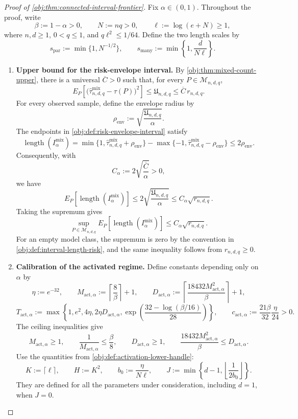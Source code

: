 \begin{proof}[Proof of \cref{obj:thm:connected-interval-frontier}]
Fix \(\alpha\in(0,1)\). Throughout the proof, write
\[
\beta:=1-\alpha>0,\qquad
N:=nq>0,\qquad
\ell:=\log(e+N)\ge1,
\]
where \(n,d\ge1\), \(0<q\le1\), and \(q\ell^2\le1/64\).
Define the two length scales by
\[
s_{\mathrm{par}}:=\min\{1,N^{-1/2}\},
\qquad
s_{\mathrm{many}}:=\min\left\{1,\frac{d}{N\ell}\right\}.
\]

\begin{enumerate}
\item \label{proof:connected-interval-upper}\textbf{Upper bound for the risk-envelope interval.}
By \cref{obj:thm:mixed-count-upper}, there is a universal
\(\overline C>0\) such that, for every \(P\in\mathcal M_{n,d,q}\),
\[
E_P\!\left[
  \bigl(\widehat\tau^{\mathrm{mix}}_{n,d,q}-\tau(P)\bigr)^2
\right]
\le \mathfrak U_{n,d,q}
\le \overline C\,r_{n,d,q}.
\]
For every observed sample, define the envelope radius by
\[
\rho_{\mathrm{env}}
:=\sqrt{\frac{\mathfrak U_{n,d,q}}{\alpha}}.
\]
The endpoints in \cref{obj:def:risk-envelope-interval} satisfy
\[
\operatorname{length}(I^{\mathrm{mix}}_\alpha)
=
\min\{1,\widehat\tau^{\mathrm{mix}}_{n,d,q}+\rho_{\mathrm{env}}\}
-
\max\{-1,\widehat\tau^{\mathrm{mix}}_{n,d,q}-\rho_{\mathrm{env}}\}
\le 2\rho_{\mathrm{env}}.
\]
Consequently, with
\[
C_\alpha:=2\sqrt{\frac{\overline C}{\alpha}}>0,
\]
we have
\[
E_P[\operatorname{length}(I^{\mathrm{mix}}_\alpha)]
\le
2\sqrt{\frac{\mathfrak U_{n,d,q}}{\alpha}}
\le C_\alpha\sqrt{r_{n,d,q}}.
\]
Taking the supremum gives
\[
\sup_{P\in\mathcal M_{n,d,q}}
E_P[\operatorname{length}(I^{\mathrm{mix}}_\alpha)]
\le C_\alpha\sqrt{r_{n,d,q}}.
\]
For an empty model class, the supremum is zero by the convention in
\cref{obj:def:interval-length-risk}, and the same inequality follows from
\(r_{n,d,q}\ge0\).

\item \label{proof:connected-interval-calibration}\textbf{Calibration of the activated regime.}
Define constants depending only on \(\alpha\) by
\[
\eta:=e^{-32},\qquad
M_{\mathrm{act},\alpha}:=\left\lceil\frac8\beta\right\rceil+1,
\qquad
D_{\mathrm{act},\alpha}
:=
\left\lceil
\frac{18432M_{\mathrm{act},\alpha}^2}{\beta}
\right\rceil+1,
\]
\[
T_{\mathrm{act},\alpha}
:=
\max\left\{
1,e^2,4\eta,2\eta D_{\mathrm{act},\alpha},
\exp\left(\frac{32-\log(\beta/16)}{28}\right)
\right\},
\qquad
c_{\mathrm{act},\alpha}
:=\frac{21\beta}{32}\frac{\eta}{24}>0.
\]
The ceiling inequalities give
\[
M_{\mathrm{act},\alpha}\ge1,\qquad
\frac1{M_{\mathrm{act},\alpha}}\le\frac\beta8,\qquad
D_{\mathrm{act},\alpha}\ge1,\qquad
\frac{18432M_{\mathrm{act},\alpha}^2}{\beta}
\le D_{\mathrm{act},\alpha}.
\]
Use the quantities from \cref{obj:def:activation-lower-handle}:
\[
K:=\lceil\ell\rceil,\qquad H:=K^2,\qquad
b_0:=\frac{\eta}{N\ell},\qquad
J:=\min\left\{d-1,\left\lfloor\frac1{2b_0}\right\rfloor\right\}.
\]
They are defined for all the parameters under consideration, including
\(d=1\), when \(J=0\).


\end{enumerate}
\end{proof}
